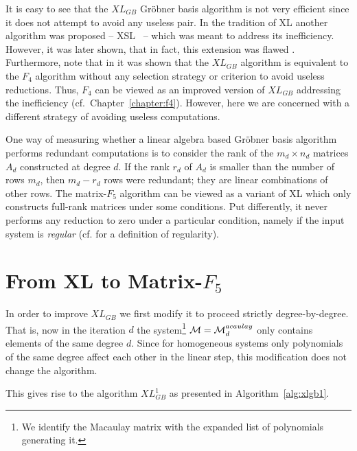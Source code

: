 It is easy to see that the $XL_{GB}$ Gröbner basis algorithm is not very efficient since it does not attempt to avoid any useless pair. In the tradition of XL another algorithm was proposed -- XSL~\cite{courtois-pieprzyk:asiacrypt02} -- which was meant to address its inefficiency. However, it was later shown, that in fact, this extension was flawed \cite{Cid2005a}. Furthermore, note that in \cite{ars-faugere:asiacrypt04} it was shown that the $XL_{GB}$ algorithm is equivalent to the $F_4$ algorithm without any selection strategy or criterion to avoid useless reductions. Thus, $F_4$ can be viewed as an improved version of $XL_{GB}$ addressing the inefficiency (cf.\ Chapter~\ref{chapter:f4}). However, here we are concerned with a different strategy of avoiding useless computations.

\hspace{1em}

One way of measuring whether a linear algebra based Gröbner basis algorithm performs redundant computations is to consider the rank of the $m_d \times n_d$ matrices $A_d$ constructed at degree $d$. If the rank $r_d$ of $A_d$ is smaller than the number of rows $m_d$, then $m_d-r_d$ rows  were redundant; they are linear combinations of other rows. The matrix-$F_5$ algorithm can be viewed as a variant of XL which only constructs full-rank matrices under some conditions. Put differently, it never performs any reduction to zero under a particular condition, namely if the input system is \emph{regular} (cf. \cite{f5} for a definition of regularity).

\section{From XL to Matrix-\texorpdfstring{$F_5$}{F5}}
\label{sec:fromxltof5}
In order to improve $XL_{GB}$ we first modify it to proceed strictly degree-by-degree. That is, now in the iteration $d$ the system\footnote{We identify the Macaulay matrix with the expanded list of polynomials generating it.} $\mathcal{M} = \mathcal{M}^{acaulay}_{d}$ only contains elements of the same degree $d$. Since for homogeneous systems only polynomials of the same degree affect each other in the linear step, this modification does not change the algorithm.

This gives rise to the algorithm $XL_{GB}^1$ as presented in Algorithm~\ref{alg:xlgb1}.

\begin{algorithm}

\caption{$XL_{GB}^1$\label{alg:xlgb1}} 
\end{algorithm}

